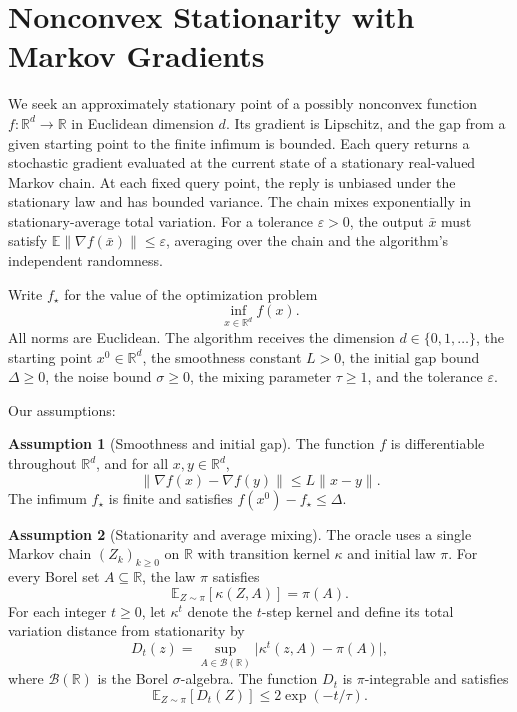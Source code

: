 \documentclass[10pt]{article}
\theoremstyle{definition}
\newtheorem{assumption}{Assumption}
\begin{document}
\section*{Nonconvex Stationarity with Markov Gradients}
We seek an approximately stationary point of a possibly nonconvex function $f:\mathbb{R}^d\to\mathbb{R}$ in Euclidean dimension $d$. Its gradient is Lipschitz, and the gap from a given starting point to the finite infimum is bounded. Each query returns a stochastic gradient evaluated at the current state of a stationary real-valued Markov chain. At each fixed query point, the reply is unbiased under the stationary law and has bounded variance. The chain mixes exponentially in stationary-average total variation. For a tolerance $\varepsilon>0$, the output $\bar{x}$ must satisfy $\mathbb{E}\|\nabla f(\bar{x})\|\leq\varepsilon$, averaging over the chain and the algorithm's independent randomness.

Write $f_\star$ for the value of the optimization problem
\[
\inf_{x\in\mathbb{R}^d} f(x).
\]
All norms are Euclidean. The algorithm receives the dimension $d\in\{0,1,\ldots\}$, the starting point $x^0\in\mathbb{R}^d$, the smoothness constant $L>0$, the initial gap bound $\Delta\geq 0$, the noise bound $\sigma\geq 0$, the mixing parameter $\tau\geq 1$, and the tolerance $\varepsilon$.

Our assumptions:
\begin{assumption}[Smoothness and initial gap]
The function $f$ is differentiable throughout $\mathbb{R}^d$, and for all $x,y\in\mathbb{R}^d$,
\[
\|\nabla f(x)-\nabla f(y)\|\leq L\|x-y\|.
\]
The infimum $f_\star$ is finite and satisfies $f(x^0)-f_\star\leq\Delta$.
\end{assumption}

\begin{assumption}[Stationarity and average mixing]
The oracle uses a single Markov chain $(Z_k)_{k\geq 0}$ on $\mathbb{R}$ with transition kernel $\kappa$ and initial law $\pi$. For every Borel set $A\subseteq\mathbb{R}$, the law $\pi$ satisfies
\[
\mathbb{E}_{Z\sim\pi}[\kappa(Z,A)]=\pi(A).
\]
For each integer $t\geq 0$, let $\kappa^t$ denote the $t$-step kernel and define its total variation distance from stationarity by
\[
D_t(z)=\sup_{A\in\mathcal{B}(\mathbb{R})}\bigl|\kappa^t(z,A)-\pi(A)\bigr|,
\]
where $\mathcal{B}(\mathbb{R})$ is the Borel $\sigma$-algebra. The function $D_t$ is $\pi$-integrable and satisfies
\[
\mathbb{E}_{Z\sim\pi}[D_t(Z)]\leq 2\exp(-t/\tau).
\]
\end{assumption}
\end{document}
